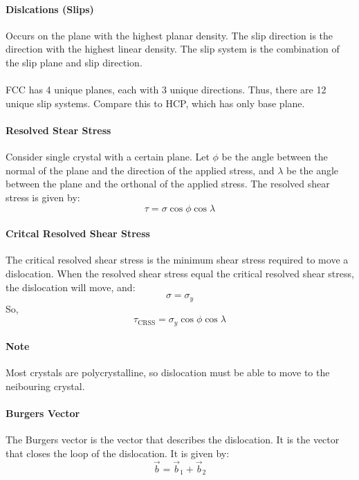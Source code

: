 \documentclass[11pt]{report}
\begin{document}
\paragraph{Dislcations (Slips)} Occurs on the plane with the highest planar density. The slip direction is the direction with the highest linear density. The slip system is the combination of the slip plane and slip direction.
\paragraph{} FCC has 4 unique planes, each with 3 unique directions. Thus, there are 12 unique slip systems. Compare this to HCP, which has only base plane.
\paragraph{Resolved Stear Stress} Consider single crystal with a certain plane. Let $\phi$ be the angle between the normal of the plane and the direction of the applied stress, and $\lambda$ be the angle between the plane and the orthonal of the applied stress. The resolved shear stress is given by:
\begin{equation}
    \tau = \sigma \cos \phi \cos \lambda
\end{equation}
\paragraph{Critcal Resolved Shear Stress} The critical resolved shear stress is the minimum shear stress required to move a dislocation. When the resolved shear stress equal the critical resolved shear stress, the dislocation will move, and:
\begin{equation}
    \sigma = \sigma_{y}
\end{equation}
So,
\begin{equation}
   \tau_{\text{CRSS}} = \sigma_{y} \cos \phi \cos \lambda
\end{equation}
\paragraph{Note} Most crystals are polycrystalline, so dislocation must be able to move to the neibouring crystal.
\paragraph{Burgers Vector} The Burgers vector is the vector that describes the dislocation. It is the vector that closes the loop of the dislocation. It is given by:
\begin{equation}
    \vec{b} = \vec{b}_1 + \vec{b}_2
\end{equation}
\end{document}
